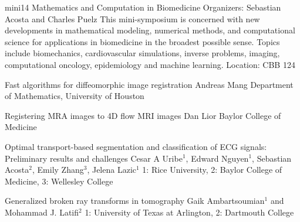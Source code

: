 \mini
{mini14}
{Mathematics and Computation in Biomedicine}
{Organizers: Sebastian Acosta and Charles Puelz}
{This mini-symposium is concerned with new developments in mathematical modeling, numerical methods, and computational science for applications in biomedicine in the broadest possible sense. Topics include biomechanics, cardiovascular simulations, inverse problems, imaging, computational oncology, epidemiology and machine learning.}
{Location: CBB 124}

\begin{talks}
\item\talk
{Fast algorithms for diffeomorphic image registration}
{Andreas Mang}
{Department of Mathematics, University of Houston}
\item\talk
{Registering MRA images to 4D flow MRI images}
{Dan Lior}
{Baylor College of Medicine}
\item\talk
{Optimal transport-based segmentation and classification of ECG signals: Preliminary results and challenges}
{Cesar A Uribe$^{1}$, Edward Nguyen$^{1}$, Sebastian Acosta$^{2}$, Emily Zhang$^{3}$, Jelena Lazic$^{1}$}
{1: Rice University, 2: Baylor College of Medicine, 3: Wellesley College}
\item\talk
{Generalized broken ray transforms in tomography}
{Gaik Ambartsoumian$^{1}$ and Mohammad J. Latifi$^{2}$}
{1: University of Texas at Arlington, 2: Dartmouth College}
\end{talks}
\room
